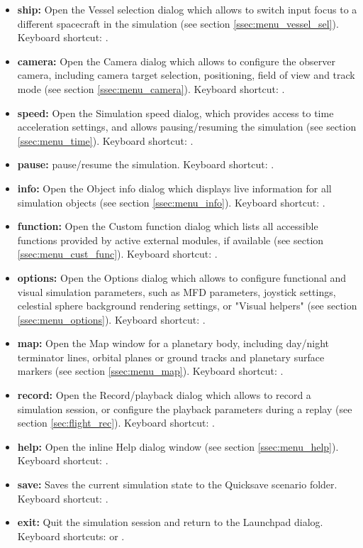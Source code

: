 \documentclass[Orbiter User Manual.tex]{subfiles}
\begin{document}
\begin{itemize}
\item \textbf{ship:} Open the Vessel selection dialog which allows to switch input focus to a different spacecraft in the simulation (see section \ref{ssec:menu_vessel_sel}). Keyboard shortcut: .
\item \textbf{camera:} Open the Camera dialog which allows to configure the observer camera, including camera target selection, positioning, field of view and track mode (see section \ref{ssec:menu_camera}). Keyboard shortcut: \Ctrl{}.
\item \textbf{speed:} Open the Simulation speed dialog, which provides access to time acceleration settings, and allows pausing/resuming the simulation (see section \ref{ssec:menu_time}). Keyboard shortcut: \Ctrl{}.
\item \textbf{pause:} pause/resume the simulation. Keyboard shortcut: \Ctrl{}.
\item \textbf{info:} Open the Object info dialog which displays live information for all simulation objects (see section \ref{ssec:menu_info}). Keyboard shortcut: \Ctrl{}.
\item \textbf{function:} Open the Custom function dialog which lists all accessible functions provided by active external modules, if available (see section \ref{ssec:menu_cust_func}). Keyboard shortcut: \Ctrl{}.
\item \textbf{options:} Open the Options dialog which allows to configure functional and visual simulation parameters, such as MFD parameters, joystick settings, celestial sphere background rendering settings, or "Visual helpers" (see section \ref{ssec:menu_options}). Keyboard shortcut: .
\item \textbf{map:} Open the Map window for a planetary body, including day/night terminator lines, orbital planes or ground tracks and planetary surface markers (see section \ref{ssec:menu_map}). Keyboard shortcut: \Ctrl{}.
\item \textbf{record:} Open the Record/playback dialog which allows to record a simulation session, or configure the playback parameters during a replay (see section \ref{sec:flight_rec}). Keyboard shortcut: \Ctrl{}.
\item \textbf{help:} Open the inline Help dialog window (see section \ref{ssec:menu_help}). Keyboard shortcut: \Alt{}.
\item \textbf{save:} Saves the current simulation state to the Quicksave scenario folder. Keyboard shortcut: \Ctrl{}.
\item \textbf{exit:} Quit the simulation session and return to the Launchpad dialog. Keyboard shortcuts: \Ctrl{} or \Alt{}.
\end{itemize}
\end{document}
